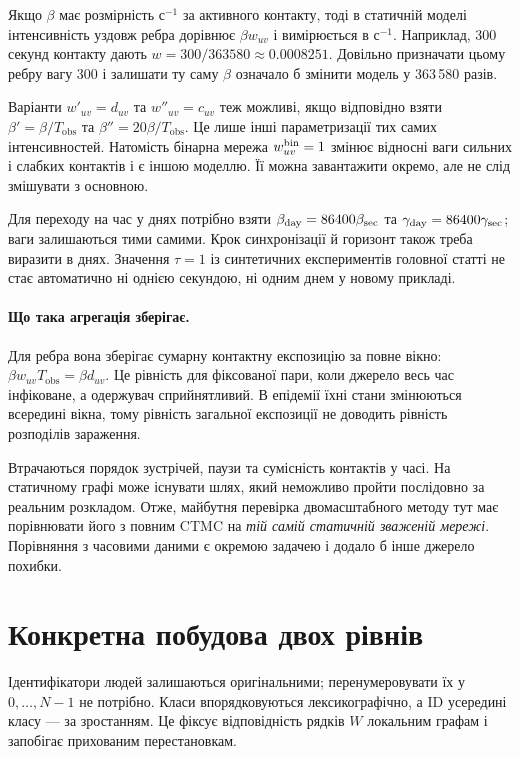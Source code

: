 \documentclass[11pt,a4paper]{article}
\begin{document}
Якщо $\beta$ має розмірність с$^{-1}$ за активного контакту, тоді в статичній моделі інтенсивність уздовж ребра дорівнює $\beta w_{uv}$ і вимірюється в с$^{-1}$. Наприклад, 300 секунд контакту дають $w=300/363580\approx0.0008251$. Довільно призначати цьому ребру вагу 300 і залишати ту саму $\beta$ означало б змінити модель у 363\,580 разів.

Варіанти $w'_{uv}=d_{uv}$ та $w''_{uv}=c_{uv}$ теж можливі, якщо відповідно взяти $\beta'=\beta/T_{\mathrm{obs}}$ та $\beta''=20\beta/T_{\mathrm{obs}}$. Це лише інші параметризації тих самих інтенсивностей. Натомість бінарна мережа $w^{\rm bin}_{uv}=1$ змінює відносні ваги сильних і слабких контактів і є іншою моделлю. Її можна завантажити окремо, але не слід змішувати з основною.

Для переходу на час у днях потрібно взяти $\beta_{\rm day}=86400\beta_{\rm sec}$ та $\gamma_{\rm day}=86400\gamma_{\rm sec}$; ваги залишаються тими самими. Крок синхронізації й горизонт також треба виразити в днях. Значення $\tau=1$ із синтетичних експериментів головної статті не стає автоматично ні однією секундою, ні одним днем у новому прикладі.

\paragraph{Що така агрегація зберігає.}
Для ребра вона зберігає сумарну контактну експозицію за повне вікно: $\beta w_{uv}T_{\mathrm{obs}}=\beta d_{uv}$. Це рівність для фіксованої пари, коли джерело весь час інфіковане, а одержувач сприйнятливий. В епідемії їхні стани змінюються всередині вікна, тому рівність загальної експозиції не доводить рівність розподілів зараження.

Втрачаються порядок зустрічей, паузи та сумісність контактів у часі. На статичному графі може існувати шлях, який неможливо пройти послідовно за реальним розкладом. Отже, майбутня перевірка двомасштабного методу тут має порівнювати його з повним CTMC на \emph{тій самій статичній зваженій мережі}. Порівняння з часовими даними є окремою задачею і додало б інше джерело похибки.

\section{Конкретна побудова двох рівнів}
Ідентифікатори людей залишаються оригінальними; перенумеровувати їх у $0,\ldots,N-1$ не потрібно. Класи впорядковуються лексикографічно, а ID усередині класу --- за зростанням. Це фіксує відповідність рядків $W$ локальним графам і запобігає прихованим перестановкам.
\end{document}
